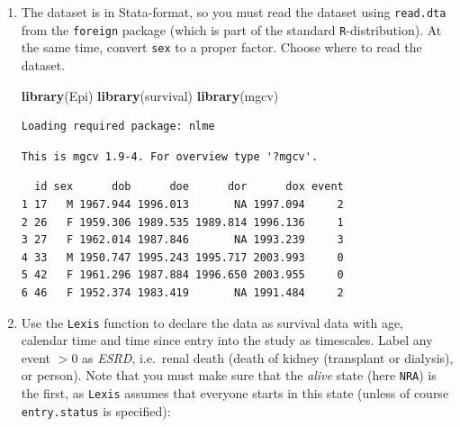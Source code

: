 \documentclass[
]{book}
\newenvironment{Shaded}{\begin{snugshade}}{\end{snugshade}}
\newcommand{\AttributeTok}[1]{\textcolor[rgb]{0.13,0.29,0.53}{#1}}
\newcommand{\CommentTok}[1]{\textcolor[rgb]{0.56,0.35,0.01}{\textit{#1}}}
\newcommand{\FunctionTok}[1]{\textcolor[rgb]{0.13,0.29,0.53}{\textbf{#1}}}
\newcommand{\NormalTok}[1]{#1}
\newcommand{\OtherTok}[1]{\textcolor[rgb]{0.56,0.35,0.01}{#1}}
\newcommand{\SpecialCharTok}[1]{\textcolor[rgb]{0.81,0.36,0.00}{\textbf{#1}}}
\newcommand{\StringTok}[1]{\textcolor[rgb]{0.31,0.60,0.02}{#1}}
\theoremstyle{definition}
\theoremstyle{definition}
\theoremstyle{definition}
\theoremstyle{definition}
\theoremstyle{remark}
\begin{document}
\begin{enumerate}
\def\labelenumi{\arabic{enumi}.}
\item
  The dataset is in Stata-format, so you must read the dataset
  using \texttt{read.dta} from the \texttt{foreign} package (which is
  part of the standard \texttt{R}-distribution). At the same time, convert
  \texttt{sex} to a proper factor. Choose where to read the dataset.

\begin{Shaded}
\begin{Highlighting}[]
\FunctionTok{library}\NormalTok{(Epi)}
\FunctionTok{library}\NormalTok{(survival)}
\FunctionTok{library}\NormalTok{(mgcv)}
\end{Highlighting}
\end{Shaded}

\begin{verbatim}
Loading required package: nlme
\end{verbatim}

\begin{verbatim}
This is mgcv 1.9-4. For overview type '?mgcv'.
\end{verbatim}

\begin{Shaded}
\end{Shaded}

\begin{verbatim}
  id sex      dob      doe      dor      dox event
1 17   M 1967.944 1996.013       NA 1997.094     2
2 26   F 1959.306 1989.535 1989.814 1996.136     1
3 27   F 1962.014 1987.846       NA 1993.239     3
4 33   M 1950.747 1995.243 1995.717 2003.993     0
5 42   F 1961.296 1987.884 1996.650 2003.955     0
6 46   F 1952.374 1983.419       NA 1991.484     2
\end{verbatim}
\item
  Use the \texttt{Lexis} function to declare the data as
  survival data with age, calendar time and time since entry into
  the study as timescales. Label any event \(>0\) as \emph{ESRD},
  i.e.~renal death (death of kidney (transplant or dialysis), or
  person).
  Note that you must make sure that the \emph{alive} state (here
  \texttt{NRA}) is the first, as \texttt{Lexis} assumes that
  everyone starts in this state (unless of course
  \texttt{entry.status} is specified):


\end{enumerate}
\end{document}
